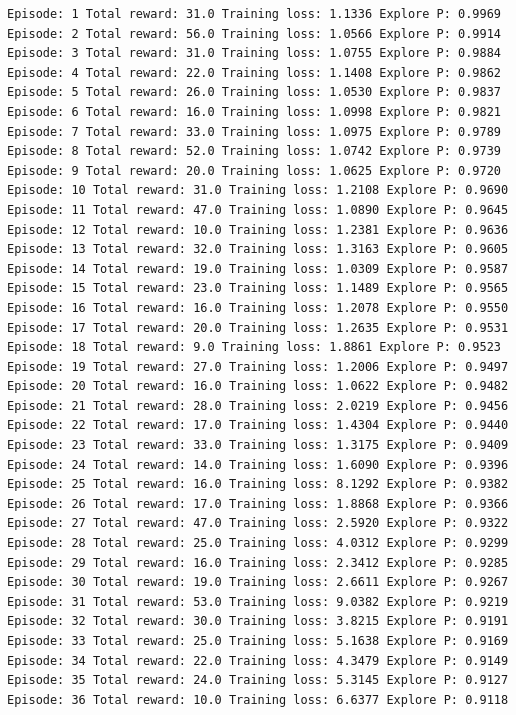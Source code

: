 \documentclass[11pt]{article}
\begin{document}
    \begin{Verbatim}[commandchars=\\\{\}]
Episode: 1 Total reward: 31.0 Training loss: 1.1336 Explore P: 0.9969
Episode: 2 Total reward: 56.0 Training loss: 1.0566 Explore P: 0.9914
Episode: 3 Total reward: 31.0 Training loss: 1.0755 Explore P: 0.9884
Episode: 4 Total reward: 22.0 Training loss: 1.1408 Explore P: 0.9862
Episode: 5 Total reward: 26.0 Training loss: 1.0530 Explore P: 0.9837
Episode: 6 Total reward: 16.0 Training loss: 1.0998 Explore P: 0.9821
Episode: 7 Total reward: 33.0 Training loss: 1.0975 Explore P: 0.9789
Episode: 8 Total reward: 52.0 Training loss: 1.0742 Explore P: 0.9739
Episode: 9 Total reward: 20.0 Training loss: 1.0625 Explore P: 0.9720
Episode: 10 Total reward: 31.0 Training loss: 1.2108 Explore P: 0.9690
Episode: 11 Total reward: 47.0 Training loss: 1.0890 Explore P: 0.9645
Episode: 12 Total reward: 10.0 Training loss: 1.2381 Explore P: 0.9636
Episode: 13 Total reward: 32.0 Training loss: 1.3163 Explore P: 0.9605
Episode: 14 Total reward: 19.0 Training loss: 1.0309 Explore P: 0.9587
Episode: 15 Total reward: 23.0 Training loss: 1.1489 Explore P: 0.9565
Episode: 16 Total reward: 16.0 Training loss: 1.2078 Explore P: 0.9550
Episode: 17 Total reward: 20.0 Training loss: 1.2635 Explore P: 0.9531
Episode: 18 Total reward: 9.0 Training loss: 1.8861 Explore P: 0.9523
Episode: 19 Total reward: 27.0 Training loss: 1.2006 Explore P: 0.9497
Episode: 20 Total reward: 16.0 Training loss: 1.0622 Explore P: 0.9482
Episode: 21 Total reward: 28.0 Training loss: 2.0219 Explore P: 0.9456
Episode: 22 Total reward: 17.0 Training loss: 1.4304 Explore P: 0.9440
Episode: 23 Total reward: 33.0 Training loss: 1.3175 Explore P: 0.9409
Episode: 24 Total reward: 14.0 Training loss: 1.6090 Explore P: 0.9396
Episode: 25 Total reward: 16.0 Training loss: 8.1292 Explore P: 0.9382
Episode: 26 Total reward: 17.0 Training loss: 1.8868 Explore P: 0.9366
Episode: 27 Total reward: 47.0 Training loss: 2.5920 Explore P: 0.9322
Episode: 28 Total reward: 25.0 Training loss: 4.0312 Explore P: 0.9299
Episode: 29 Total reward: 16.0 Training loss: 2.3412 Explore P: 0.9285
Episode: 30 Total reward: 19.0 Training loss: 2.6611 Explore P: 0.9267
Episode: 31 Total reward: 53.0 Training loss: 9.0382 Explore P: 0.9219
Episode: 32 Total reward: 30.0 Training loss: 3.8215 Explore P: 0.9191
Episode: 33 Total reward: 25.0 Training loss: 5.1638 Explore P: 0.9169
Episode: 34 Total reward: 22.0 Training loss: 4.3479 Explore P: 0.9149
Episode: 35 Total reward: 24.0 Training loss: 5.3145 Explore P: 0.9127
Episode: 36 Total reward: 10.0 Training loss: 6.6377 Explore P: 0.9118

\end{Verbatim}
\end{document}
